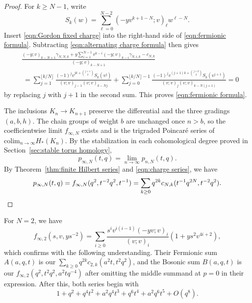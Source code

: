 \documentclass[reqno]{amsart}
\theoremstyle{definition}
\theoremstyle{remark}
\begin{document}
\begin{proof}
For $k\ge N-1$, write
\[S_k(w)=\sum_{\ell=0}^{N-2}(-yv^{k+1-N};v)_\ell w^{\ell-N}.\]
Insert \eqref{eqn:Gordon fixed charge} into the right-hand side of \eqref{eqn:fermionic formula}. Subtracting \eqref{eqn:alternating charge formula} then gives
\[\begin{aligned}
&\frac{(-y;v)_{k-N+1}\gamma_{N,N,k}+y\sum_{i=1}^{N-1}v^{k-i}(-y;v)_{k-i}\gamma_{N,i,k}-c_{N,k}}{(-y;v)_{k-N+1}}\\
&\ =\sum_{j=1}^{\lfloor k/N\rfloor}\frac{(-1)^jv^{jk+\binom{j+1}{2}}S_k(v^j)}{(v;v)_{j-1}(v;v)_{k-Nj}}+\sum_{j=0}^{\lfloor k/N\rfloor-1}\frac{(-1)^jv^{(j+1)k+\binom{j+2}{2}}S_k(v^{j+1})}{(v;v)_j(v;v)_{k-N(j+1)}}=0
\end{aligned}\]by replacing $j$ with $j+1$ in the second sum. This proves \eqref{eqn:fermionic formula}.

The inclusions $K_n\to K_{n+1}$ preserve the differential and the three gradings $(a,b,h)$. The chain groups of weight $b$ are unchanged once $n>b$, so the coefficientwise limit $f_{\infty,N}$ exists and is the trigraded Poincar\'e series of $\mathrm{colim}_{n\to\infty}H_*(K_n)$. By the stabilization in each cohomological degree proved in Section~\ref{sec:stable torus homology},
\[p_{\infty,N}(t,q)=\lim_{n\to\infty}p_{n,N}(t,q).\]By Theorem~\ref{thm:finite Hilbert series} and \eqref{eqn:charge series}, we have
\[p_{\infty,N}(t,q)=f_{\infty,N}(q^2,t^{-2}q^2,t^{-1})=\sum_{k\ge0}q^{2k}c_{N,k}(t^{-1}q^{2N},t^{-2}q^2).\qedhere\]
\end{proof}

For $N=2$, we have
\begin{equation}\label{eqn:GOR fermionic series}
f_{\infty,2}(s,v,ys^{-2})=\sum_{i\ge0}\frac{s^iv^{i(i-1)}(-yv;v)_i}{(v;v)_i}\left(1+ys^2v^{4i+2}\right),
\end{equation}
which confirms  \cite[Conjecture~4.9]{gorsky2013stable} with the following understanding. Their Fermionic sum $A(a,q,t)$ is our $\sum_{k\ge0}q^{2k}c_{2,k}(a^2t,t^2q^2)$, and the Bosonic sum $B(a,q,t)$ is our $f_{\infty,2}(q^2,t^2q^2,a^2tq^{-4})$ after omitting the middle summand at $p=0$ in their expression. After this, both series begin with
\[1+q^2+q^4t^2+a^2q^4t^3+q^6t^4+a^2q^6t^5+O(q^8).\]



\end{document}
